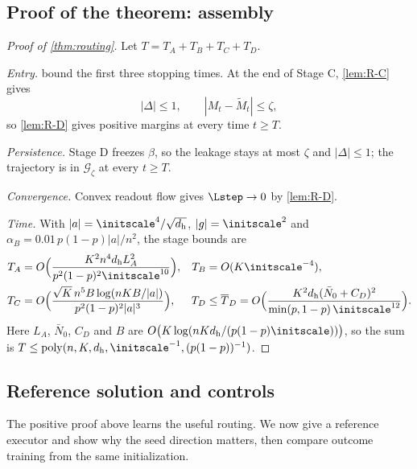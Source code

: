 \subsection{Proof of the theorem: assembly}
\begin{proof}[Proof of \cref{thm:routing}]
Let $T=T_A+T_B+T_C+T_D$.

\emph{Entry.}  bound the first three stopping times. At the end of Stage C,
\cref{lem:R-C} gives
\[
 |\Delta|\le1,\qquad |M_t-\widetilde M_t|\le\zeta,
\]
so \cref{lem:R-D} gives positive margins at every time $t\ge T$.

\emph{Persistence.} Stage D freezes $\beta$, so the leakage stays at most $\zeta$ and $|\Delta|\le1$; the trajectory is in
$\mathcal G_\zeta$ at every $t\ge T$.

\emph{Convergence.} Convex readout flow gives $\Lstep\to0$ by \cref{lem:R-D}.

\emph{Time.} With $|a|=\initscale^4/\sqrt{d_{\mathrm h}}$, $|g|=\initscale^2$ and $\alpha_B=0.01\,p(1-p)|a|/n^2$, the stage bounds are
\[
 \begin{aligned}
 T_A&=O\Bigl(\frac{K^2n^4d_{\mathrm h}L_A^2}{p^2(1-p)^2\initscale^{10}}\Bigr), &
 T_B&=O(K\initscale^{-4}),\\
 T_C&=O\Bigl(\frac{\sqrt K\,n^5B\log(nKB/|a|)}{p^2(1-p)^2|a|^3}\Bigr), &
 T_D&\le\overline T_D=O\Bigl(\frac{K^2d_{\mathrm h}(\bar N_0+C_D)^2}{\min(p,1-p)\,\initscale^{12}}\Bigr).
 \end{aligned}
\]
Here $L_A$, $\bar N_0$, $C_D$ and $B$ are $O\bigl(K\log(nKd_{\mathrm h}/(p(1-p)\initscale))\bigr)$, so the sum is
$T\le\mathrm{poly}(n,K,d_{\mathrm h},\initscale^{-1},(p(1-p))^{-1})$.
\end{proof}

\subsection{Reference solution and controls}
The positive proof above learns the useful routing. We now give a reference executor and show why the seed direction matters,
then compare outcome training from the same initialization.

